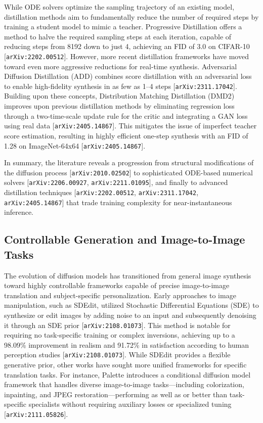 \documentclass[11pt]{article}
\begin{document}
While ODE solvers optimize the sampling trajectory of an existing model, distillation methods aim to fundamentally reduce the number of required steps by training a student model to mimic a teacher. Progressive Distillation offers a method to halve the required sampling steps at each iteration, capable of reducing steps from 8192 down to just 4, achieving an FID of 3.0 on CIFAR-10 [\texttt{arXiv:2202.00512}]. However, more recent distillation frameworks have moved toward even more aggressive reductions for real-time synthesis. Adversarial Diffusion Distillation (ADD) combines score distillation with an adversarial loss to enable high-fidelity synthesis in as few as 1–4 steps [\texttt{arXiv:2311.17042}]. Building upon these concepts, Distribution Matching Distillation (DMD2) improves upon previous distillation methods by eliminating regression loss through a two-time-scale update rule for the critic and integrating a GAN loss using real data [\texttt{arXiv:2405.14867}]. This mitigates the issue of imperfect teacher score estimation, resulting in highly efficient one-step synthesis with an FID of 1.28 on ImageNet-64x64 [\texttt{arXiv:2405.14867}].

In summary, the literature reveals a progression from structural modifications of the diffusion process [\texttt{arXiv:2010.02502}] to sophisticated ODE-based numerical solvers [\texttt{arXiv:2206.00927}, \texttt{arXiv:2211.01095}], and finally to advanced distillation techniques [\texttt{arXiv:2202.00512}, \texttt{arXiv:2311.17042}, \texttt{arXiv:2405.14867}] that trade training complexity for near-instantaneous inference.

\subsection{Controllable Generation and Image-to-Image Tasks}

The evolution of diffusion models has transitioned from general image synthesis toward highly controllable frameworks capable of precise image-to-image translation and subject-specific personalization. Early approaches to image manipulation, such as SDEdit, utilized Stochastic Differential Equations (SDE) to synthesize or edit images by adding noise to an input and subsequently denoising it through an SDE prior [\texttt{arXiv:2108.01073}]. This method is notable for requiring no task-specific training or complex inversions, achieving up to a 98.09\% improvement in realism and 91.72\% in satisfaction according to human perception studies [\texttt{arXiv:2108.01073}]. While SDEdit provides a flexible generative prior, other works have sought more unified frameworks for specific translation tasks. For instance, Palette introduces a conditional diffusion model framework that handles diverse image-to-image tasks—including colorization, inpainting, and JPEG restoration—performing as well as or better than task-specific specialists without requiring auxiliary losses or specialized tuning [\texttt{arXiv:2111.05826}].
\end{document}
